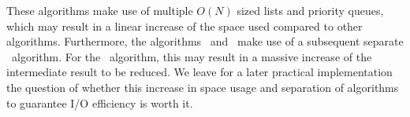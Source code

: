
These algorithms make use of multiple $O(N)$ sized lists and priority queues,
which may result in a linear increase of the space used compared to other
algorithms. Furthermore, the algorithms \Restrict\ and \Apply\ make use of a
subsequent separate \Reduce\ algorithm. For the \Apply\ algorithm, this may
result in a massive increase of the intermediate result to be reduced.  We
leave for a later practical implementation the question of whether this increase
in space usage and separation of algorithms to guarantee I/O efficiency is worth
it.


